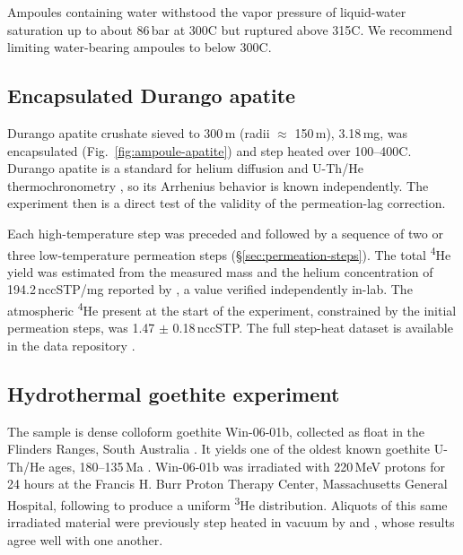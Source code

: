 Ampoules containing water withstood the vapor pressure of liquid-water saturation up to about 86\,bar at 300\textdegree C \citep{haar1984} but ruptured above 315\textdegree C. We recommend limiting water-bearing ampoules to below 300\textdegree C.

\subsection{Encapsulated Durango apatite}\label{sec:methods-apatite}

Durango apatite crushate sieved to 300\,\textmu m (radii $\approx$ 150\,\textmu m), 3.18\,mg, was encapsulated (Fig.~\ref{fig:ampoule-apatite}) and step heated over 100--400\textdegree C. Durango apatite is a standard for helium diffusion and U-Th/He thermochronometry \citep{zeitler1987,wolf1996,farley2000,shuster2005,shuster2006,flowers2007}, so its Arrhenius behavior is known independently. The experiment then is a direct test of the validity of the permeation-lag correction.

Each high-temperature step was preceded and followed by a sequence of two or three low-temperature permeation steps (\S\ref{sec:permeation-steps}). The total \textsuperscript{4}He yield was estimated from the measured mass and the helium concentration of 194.2\,nccSTP/mg reported by \citet{farley2000}, a value verified independently in-lab. The atmospheric \textsuperscript{4}He present at the start of the experiment, constrained by the initial permeation steps, was 1.47 $\pm$ 0.18\,nccSTP. The full step-heat dataset is available in the data repository \citep{thyer_2026}.

\subsection{Hydrothermal goethite experiment}\label{sec:methods-goethite}

The sample is dense colloform goethite Win-06-01b, collected as float in the Flinders Ranges, South Australia \citep{waltenberg2012,monteiro2017}. It yields one of the oldest known goethite U-Th/He ages, 180--135\,Ma \citep{waltenberg2012}. Win-06-01b was irradiated with 220\,MeV protons for 24 hours at the Francis H. Burr Proton Therapy Center, Massachusetts General Hospital, following \citet{shuster2005} to produce a uniform \textsuperscript{3}He distribution. Aliquots of this same irradiated material were previously step heated in vacuum by \citet{monteiro2017} and \citet{farley2024}, whose results agree well with one another. 

